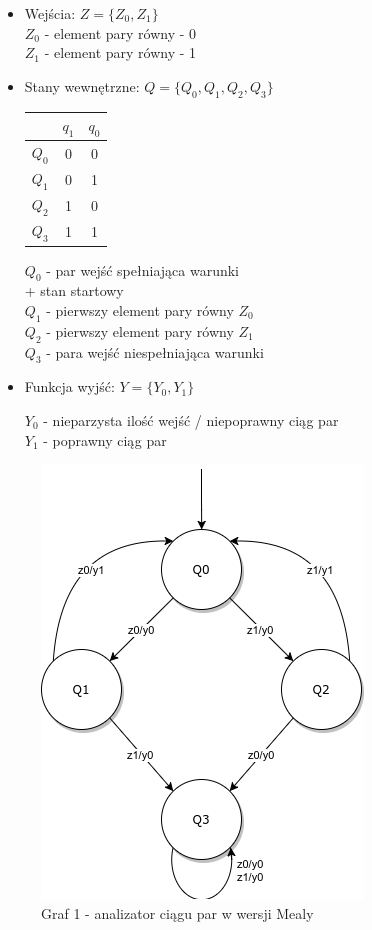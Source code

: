 \documentclass[12pt,a4paper]{article}
\begin{document}
		\begin{itemize}
			\item Wejścia: \(Z = \{Z_0, Z_1\}\)\\
				
				\(Z_0\) - element pary równy - 0\\
				\(Z_1\) - element pary równy - 1\\
				
			\item Stany wewnętrzne: \(Q =\{Q_0, Q_1, Q_2, Q_3\}\)
				
				\begin{minipage}{{.5\textwidth}}
					\centering
					\begin{tabular}{r|cc}
						&	\(q_1\)	&	\(q_0\)\\\hline
						\(Q_0\)	&	0	&	0	\\
						\(Q_1\)	&	0	&	1	\\
						\(Q_2\)	&	1	&	0	\\
						\(Q_3\)	&	1	&	1	\\
					\end{tabular}
				\end{minipage}%
				\begin{minipage}{{.5\textwidth}}	
					\(Q_0\) - par wejść spełniająca warunki\\+ stan startowy\\
					\(Q_1\) - pierwszy element pary równy $Z_0$\\
					\(Q_2\) - pierwszy element pary równy $Z_1$\\
					\(Q_3\) - para wejść niespełniająca warunki\\
				\end{minipage}
				
			\item Funkcja wyjść: \(Y=\{Y_0, Y_1\}\)
				
				\(Y_0\) - nieparzysta ilość wejść / niepoprawny ciąg par\\
				\(Y_1\) - poprawny ciąg par
		\end{itemize}
		
		\begin{figure}[H]
			\centering
			\includegraphics[width=.5\textwidth]{schem/diag1.png}
			\\
			\vspace{.1cm}
			Graf 1 - analizator ciągu par w wersji Mealy
		\end{figure}
\end{document}
